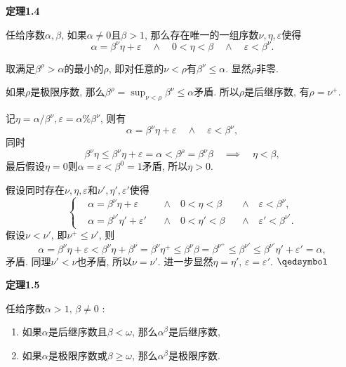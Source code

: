 \documentclass[UTF8]{ctexart}
\begin{document}
\newpage

\vspace{10pt}

\hypertarget{sec:定理1.4}{}
\noindent\textbf{定理1.4}

任给序数$\alpha,\beta$, 如果$\alpha\neq 0$且$\beta>1$,
那么存在唯一的一组序数$\nu,\eta,\varepsilon$使得
\[
    \alpha=\beta^\nu\eta+\varepsilon\quad\land\quad
    0<\eta<\beta\quad\land\quad\varepsilon<\beta^\nu.
\]



取满足$\beta^\rho>\alpha$的最小的$\rho$,
即对任意的$\nu<\rho$有$\beta^\nu\leqslant\alpha$. 显然$\rho$非零.

\vspace{3pt}
如果$\rho$是极限序数, 那么$\displaystyle
\beta^\rho=\sup_{\nu<\rho}\beta^\nu\leqslant\alpha$矛盾.
所以$\rho$是后继序数, 有$\rho=\nu^+$.

\vspace{3pt}
记$\eta=\alpha/\beta^\nu,\varepsilon=\alpha\%\beta^\nu$, 则有
\[
    \alpha=\beta^\nu\eta+\varepsilon\quad\land\quad\varepsilon<\beta^\nu,
\]
同时
\[
    \beta^\nu\eta\leqslant\beta^\nu\eta+\varepsilon=\alpha<\beta^\rho=
    \beta^\nu\beta\quad\implies\quad\eta<\beta,
\]
最后假设$\eta=0$则$\alpha=\varepsilon<\beta^0=1$矛盾, 所以$\eta>0$.


假设同时存在$\nu,\eta,\varepsilon$和$\nu',\eta',\varepsilon'$使得
\[\left\{\begin{aligned}
    &\alpha=\beta^\nu\eta+\varepsilon\,&&\land\quad
    0<\eta<\beta\,&&\land\quad\varepsilon<\beta^\nu,\\[-3pt]
    &\alpha=\beta^{\nu'}\eta'+\varepsilon'\,&&\land\quad
    0<\eta'<\beta\,&&\land\quad\varepsilon'<\beta^{\nu'}.
\end{aligned}\right.\]
假设$\nu<\nu'$, 即$\nu^+\leqslant\nu'$, 则
\[
    \alpha=\beta^\nu\eta+\varepsilon<\beta^\nu\eta+\beta^\nu=
    \beta^\nu\eta^+\leqslant\beta^\nu\beta=\beta^{\nu^+}\leqslant
    \beta^{\nu'}\leqslant\beta^{\nu'}\eta'+\varepsilon'=\alpha,
\]
矛盾. 同理$\nu'<\nu$也矛盾, 所以$\nu=\nu'$.
进一步显然$\eta=\eta',\,\varepsilon=\varepsilon'$. \hfill $\qedsymbol$

\vspace{10pt}

\hypertarget{sec:定理1.5}{}
\noindent\textbf{定理1.5}

任给序数$\alpha>1,\,\beta\neq 0$ :
\begin{enumerate}
    \item 如果$\alpha$是后继序数且$\beta<\omega$, 那么$\alpha^\beta$是后继序数,
    \item 如果$\alpha$是极限序数或$\beta\geqslant\omega$,
    那么$\alpha^\beta$是极限序数.
\end{enumerate}
\end{document}
